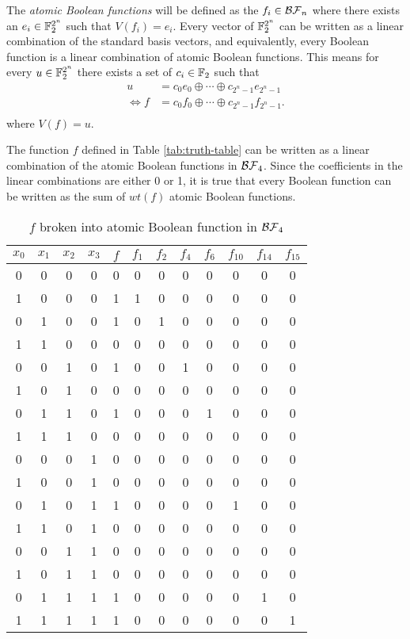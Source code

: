 \par The {\em atomic Boolean functions} will be defined as the
$f_i\in\mathcal{BF}_n$ where there exists an $e_i\in\mathbb{F}_2^{2^n}$ such that
$V(f_i)=e_i$. Every vector of $\mathbb{F}_2^{2^n}$ can be written as a linear
combination of the standard basis vectors, and equivalently, every Boolean
function is a linear combination of atomic Boolean functions. This means
for every $u\in\mathbb{F}_2^{2^n}$ there exists a set of $c_i\in\mathbb{F}_2$ such that
\begin{align*}
	u  &=c_0e_0\oplus\cdots\oplus c_{2^n-1}e_{2^n-1} \\
	\Leftrightarrow f &=c_0f_0\oplus\cdots\oplus c_{2^n-1}f_{2^n-1}.\\
\end{align*}
where $V(f)=u$.

\par The function $f$ defined in Table \ref{tab:truth-table} can be written
as a linear combination of the atomic Boolean functions in $\mathcal{BF}_4$. Since
the coefficients in the linear combinations are either 0 or 1, it is true
that every Boolean function can be written as the sum of $wt(f)$ atomic
Boolean functions.
\begin{table}[h!]\label{tab:atomic-f}
  \centering
  \begin{tabular}{|c|c|c|c||c|c|c|c|c|c|c|c|}
    \hline
    $x_0$&$x_1$&$x_2$&$x_3$
      &$f$&$f_1$&$f_2$&$f_4$&$f_6$&$f_{10}$&$f_{14}$&$f_{15}$\\
    \hline
    0&0&0&0&0&0&0&0&0&0&0&0\\
    1&0&0&0&1&1&0&0&0&0&0&0\\
    0&1&0&0&1&0&1&0&0&0&0&0\\
    1&1&0&0&0&0&0&0&0&0&0&0\\
    0&0&1&0&1&0&0&1&0&0&0&0\\
    1&0&1&0&0&0&0&0&0&0&0&0\\
    0&1&1&0&1&0&0&0&1&0&0&0\\
    1&1&1&0&0&0&0&0&0&0&0&0\\
    0&0&0&1&0&0&0&0&0&0&0&0\\
    1&0&0&1&0&0&0&0&0&0&0&0\\
    0&1&0&1&1&0&0&0&0&1&0&0\\
    1&1&0&1&0&0&0&0&0&0&0&0\\
    0&0&1&1&0&0&0&0&0&0&0&0\\
    1&0&1&1&0&0&0&0&0&0&0&0\\
    0&1&1&1&1&0&0&0&0&0&1&0\\
    1&1&1&1&1&0&0&0&0&0&0&1\\
    \hline
  \end{tabular}
  \caption{$f$ broken into atomic Boolean function in $\mathcal{BF}_4$}
\end{table}

